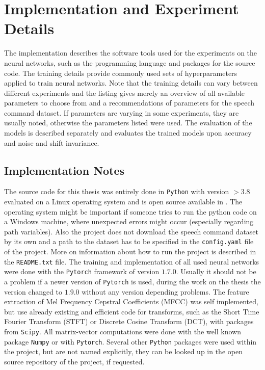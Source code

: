 
\section{Implementation and Experiment Details}\label{sec:exp_details}
\thesisStateReady
The implementation describes the software tools used for the experiments on the neural networks, such as the programming language and packages for the source code.
The training details provide commonly used sets of hyperparameters applied to train neural networks.
Note that the training details can vary between different experiments and the listing gives merely an overview of all available parameters to choose from and a recommendations of parameters for the speech command dataset.
If parameters are varying in some experiments, they are usually noted, otherwise the parameters listed were used.
The evaluation of the models is described separately and evaluates the trained models upon accuracy and noise and shift invariance.



\subsection{Implementation Notes}\label{sec:exp_details_implementation}
The source code for this thesis was entirely done in \texttt{Python} with version $>3.8$ evaluated on a Linux operating system and is open source available in \cite{KWSGame}.
The operating system might be important if someone tries to run the python code on a Windows machine, where unexpected errors might occur (especially regarding path variables).
Also the project does not download the speech command dataset by its own and a path to the dataset has to be specified in the \texttt{config.yaml} file of the project.
More on information about how to run the project is described in the \texttt{README.txt} file.
The training and implementation of all used neural networks were done with the \texttt{Pytorch} \cite{Pytorch} framework of version $1.7.0$. 
Usually it should not be a problem if a newer version of \texttt{Pytorch} is used, during the work on the thesis the version changed to $1.9.0$ without any version depending problems.
The feature extraction of Mel Frequency Cepstral Coefficients (MFCC) was self implemented, but use already existing and efficient code for transforms, such as the Short Time Fourier Transform (STFT) or Discrete Cosine Transform (DCT), with packages from \texttt{Scipy}.
All matrix-vector computations were done with the well known package \texttt{Numpy} or with \texttt{Pytorch}.
Several other \texttt{Python} packages were used within the project, but are not named explicitly, they can be looked up in the open source repository of the project, if requested.


